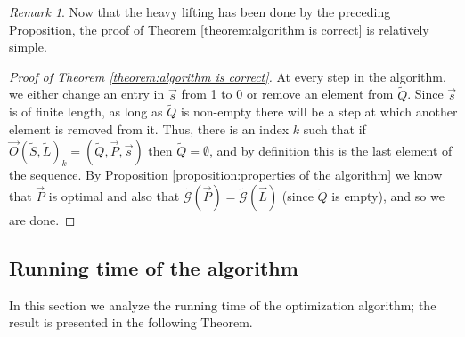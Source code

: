 \documentclass[12pt]{amsbook}
\theoremstyle{plain}
\theoremstyle{definition}
\theoremstyle{remark}
\newtheorem{remark}{Remark}
\newcommand{\lst}{\vec}
\newcommand{\set}{\tilde}
\newcommand{\genfun}{\tilde{\mathcal{G}}}
\begin{document}
\begin{remark}
Now that the heavy lifting has been done by the preceding Proposition, the proof of Theorem \ref{theorem:algorithm is correct} is relatively simple.
\end{remark}

\begin{proof}[Proof of Theorem \ref{theorem:algorithm is correct}]
At every step in the algorithm, we either change an entry in $\lst s$ from 1 to 0 or remove an element from $\set Q$.  Since $\lst s$ is of finite length, as long as $\set Q$ is non-empty there will be a step at which another element is removed from it.  Thus, there is an index $k$ such that if $\lst O(\set S,\set L)_k=(\set Q,\lst P,\lst s)$ then $\set Q=\emptyset$, and by definition this is the last element of the sequence.  By Proposition \ref{proposition:properties of the algorithm} we know that $\lst P$ is optimal and also that $\genfun(\lst P)=\genfun(\lst L)$ (since $\set Q$ is empty), and so we are done.
\end{proof}
\subsection{Running time of the algorithm}

\label{subsubsection:running time analysis}

In this section we analyze the running time of the optimization algorithm;  the result is presented in the following Theorem.
\end{document}
